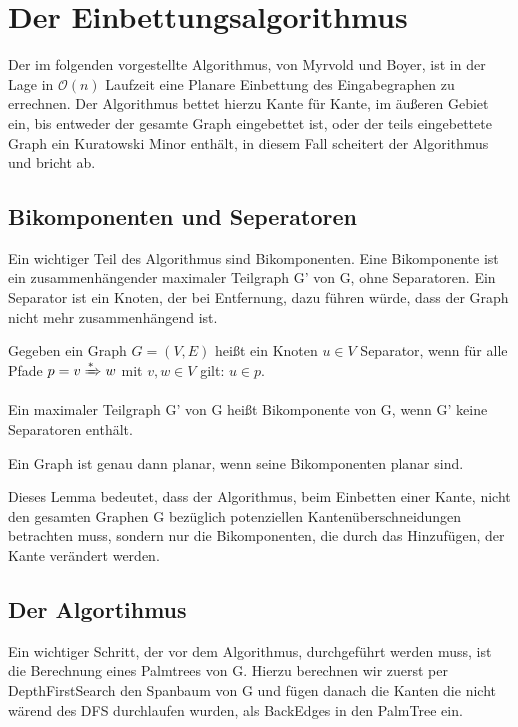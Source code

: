 \documentclass[runningheads]{llncs}
\begin{document}
\section{Der Einbettungsalgorithmus}
    Der im folgenden vorgestellte Algorithmus, von Myrvold und Boyer, ist in der Lage in $\mathcal{O}(n)$ Laufzeit eine Planare Einbettung
    des Eingabegraphen zu errechnen. Der Algorithmus bettet hierzu Kante für Kante, im äußeren Gebiet ein, bis entweder der gesamte Graph eingebettet ist, oder
    der teils eingebettete Graph ein Kuratowski Minor enthält, in diesem Fall scheitert der Algorithmus und bricht ab.
    
    \subsection{Bikomponenten und Seperatoren}
    Ein wichtiger Teil des Algorithmus sind Bikomponenten. Eine Bikomponente ist ein zusammenhängender maximaler Teilgraph G' von G, ohne Separatoren.
    Ein Separator ist ein Knoten, der bei Entfernung, dazu führen würde, dass der Graph nicht mehr zusammenhängend ist.

    
    \begin{definition}[Separator]
        Gegeben ein Graph $G=(V,E)$ heißt ein Knoten $u \in V$ Separator, wenn für alle Pfade $p = v \xRightarrow{*} w$ mit $v,w \in V$
        gilt: $u \in p$.
    \end{definition}
    \begin{definition}[Bikomponente]
        Ein  maximaler Teilgraph G' von G heißt Bikomponente von G, wenn G' keine Separatoren enthält.
    \end{definition}
    \begin{lemma}
        Ein Graph ist genau dann planar, wenn seine Bikomponenten planar sind.
    \end{lemma}
    
    Dieses Lemma bedeutet, dass der Algorithmus, beim Einbetten einer Kante, nicht den gesamten Graphen G bezüglich potenziellen Kantenüberschneidungen 
    betrachten muss, sondern nur die Bikomponenten, die durch das Hinzufügen, der Kante verändert werden.

    \subsection{Der Algortihmus}
    Ein wichtiger Schritt, der vor dem Algorithmus, durchgeführt werden muss, 
    ist die Berechnung eines Palmtrees von G. Hierzu berechnen wir zuerst per DepthFirstSearch 
    den Spanbaum von G und fügen danach die Kanten die nicht wärend des DFS durchlaufen wurden, als BackEdges in den PalmTree ein. 
\end{document}
